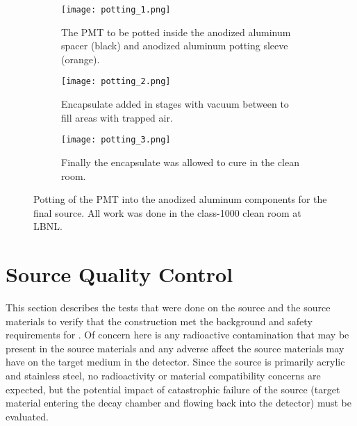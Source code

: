 \begin{figure}
\begin{subfigure}{.385\textwidth}
\texttt{[image: potting\_1.png]}
\caption{The PMT to be potted inside the anodized aluminum spacer (black) and anodized aluminum potting sleeve (orange).}
\label{fig:potting_a}
\end{subfigure}
\begin{subfigure}{.305\textwidth}
\texttt{[image: potting\_2.png]}
\caption{Encapsulate added in stages with vacuum between to fill areas with trapped air.}
\label{fig:potting_b}
\end{subfigure}
\begin{subfigure}{.29\textwidth}
\texttt{[image: potting\_3.png]}
\caption{Finally the encapsulate was allowed to cure in the clean room.}
\label{fig:potting_c}
\end{subfigure}
\caption{Potting of the PMT into the anodized aluminum components for the final source. All work was done in the class-1000 clean room at LBNL.}
\label{fig:potting}
\end{figure}

\section{Source Quality Control}
\label{chap:tests}

This section describes the tests that were done on the source and the source materials to verify that the construction met the background and safety requirements for {\snop}. 
Of concern here is any radioactive contamination that may be present in the source materials and any adverse affect the source materials may have on the target medium in the detector.
Since the source is primarily acrylic and stainless steel, no radioactivity or material compatibility concerns are expected, but the potential impact of catastrophic failure of the source (target material entering the decay chamber and flowing back into the detector) must be evaluated.

